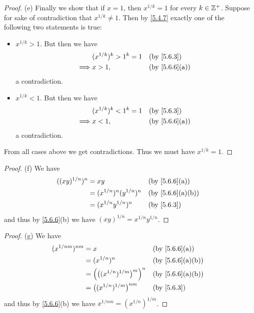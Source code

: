 \begin{proof}{(e)}
  Finally we show that if \(x = 1\), then \(x^{1 / k} = 1\) for every \(k \in \mathbb{Z}^+\).
  Suppose for sake of contradiction that \(x^{1 / k} \neq 1\).
  Then by \cref{5.4.7} exactly one of the following two statements is true:
  \begin{itemize}
    \item \(x^{1 / k} > 1\).
          But then we have
          \begin{align*}
                     & (x^{1 / k})^k > 1^k = 1 &  & \by{5.6.3}    \\
            \implies & x > 1,                  &  & \by{5.6.6}[a]
          \end{align*}
          a contradiction.
    \item \(x^{1 / k} < 1\).
          But then we have
          \begin{align*}
                     & (x^{1 / k})^k < 1^k = 1 &  & \by{5.6.3}    \\
            \implies & x < 1,                  &  & \by{5.6.6}[a]
          \end{align*}
          a contradiction.
  \end{itemize}
  From all cases above we get contradictions.
  Thus we must have \(x^{1 / k} = 1\).
\end{proof}

\begin{proof}{(f)}
  We have
  \begin{align*}
    ((xy)^{1 / n})^n & = xy                          &  & \by{5.6.6}[a]   \\
                     & = (x^{1 / n})^n (y^{1 / n})^n &  & \by{5.6.6}[a,b] \\
                     & = (x^{1 / n} y^{1 / n})^n     &  & \by{5.6.3}
  \end{align*}
  and thus by \cref{5.6.6}(b) we have \((xy)^{1 / n} = x^{1 / n} y^{1 / n}\).
\end{proof}

\begin{proof}{(g)}
  We have
  \begin{align*}
    (x^{1 / nm})^{nm} & = x                                           &  & \by{5.6.6}[a]   \\
                      & = (x^{1 / n})^n                               &  & \by{5.6.6}[a,b] \\
                      & = \Big(\big((x^{1 / n})^{1 / m}\big)^m\Big)^n &  & \by{5.6.6}[a,b] \\
                      & = \big((x^{1 / n})^{1 / m}\big)^{nm}          &  & \by{5.6.3}
  \end{align*}
  and thus by \cref{5.6.6}(b) we have \(x^{1 / nm} = (x^{1 / n})^{1 / m}\).
\end{proof}

